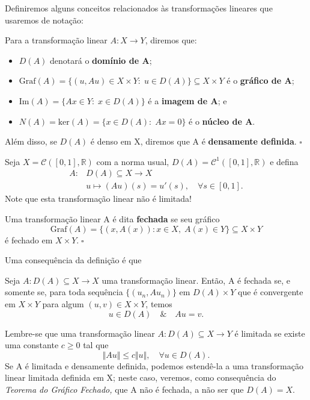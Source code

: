 \documentclass[../functional_analysis.tex]{subfiles}
\begin{document}
Definiremos alguns conceitos relacionados às transformações lineares que usaremos de notação:

\begin{def*}
	Para a transformação linear \(A:X\rightarrow Y\), diremos que:
	\begin{itemize}
		\item \(D(A)\) denotará o \textbf{domínio de A};
		\item \(\mathrm{Graf}(A) = \{(u, Au)\in X\times Y:\; u\in D(A)\}\subseteq X\times Y\) é o \textbf{gráfico de A};
		\item \(\mathrm{Im}(A)=\{Ax\in Y:\; x\in D(A)\}\) é a \textbf{imagem de A}; e
		\item \(N(A) = \mathrm{ker}(A) = \{x\in D(A):\; Ax = 0\}\) é o \textbf{núcleo de A}.
	\end{itemize}
	Além disso, se \(D(A)\) é denso em X, diremos que A é \textbf{densamente definida}. \(\square\)
\end{def*}

\begin{example}
	Seja \(X = \mathcal{C}([0, 1], \mathbb{R})\) com a norma usual, \(D(A) = \mathcal{C}^{1}([0, 1], \mathbb{R})\) e defina
	\begin{align*}
		A: & D(A)\subseteq X\rightarrow X                             \\
		   & u\longmapsto (Au)(s) = u'(s), \quad \forall s\in [0, 1].
	\end{align*}
	Note que esta transformação linear não é limitada!
\end{example}

\begin{def*}
	Uma transformação linear A é dita \textbf{fechada} se seu gráfico
	\[
		\mathrm{Graf}(A) = \{(x, A(x)): x\in X,\; A(x)\in Y\} \subseteq X\times Y
	\]
	é fechado em \(X\times Y.\; \square\)
\end{def*}
Uma consequência da definição é que
\begin{prop*}
	Seja \(A:D(A)\subseteq X\rightarrow X\) uma transformação linear. Então, A é fechada se, e somente se, para toda sequência \(\{(u_{n}, Au_{n})\}\) em \(D(A)\times Y\) que é convergente em \(X\times Y\) para algum \((u, v)\in X\times Y\), temos
	\[
		u\in D(A) \quad\&\quad Au = v.
	\]
\end{prop*}


Lembre-se que uma transformação linear \(A:D(A)\subseteq X\rightarrow Y\) é limitada se existe uma constante \(c\geq 0\) tal que
\[
	\Vert Au \Vert\leq c\Vert u \Vert,\quad \forall u\in D(A).
\]
Se A é limitada e densamente definida, podemos estendê-la a uma transformação linear limitada definida em X; neste caso, veremos, como consequência do \textit{Teorema do Gráfico Fechado,} que A não é fechada, a não ser que \(D(A) = X.\)
\end{document}
